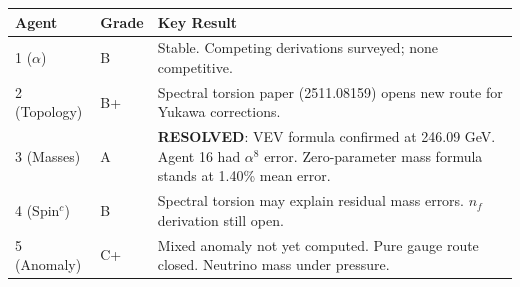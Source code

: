 \documentclass[11pt,a4paper]{article}
\newcommand{\RESOLVED}{\textcolor{dfdgreen}{\textbf{RESOLVED}}}
\begin{document}
\begin{center}
\begin{tabular}{llp{9cm}}
\toprule
\textbf{Agent} & \textbf{Grade} & \textbf{Key Result} \\
\midrule
1 ($\alpha$) & B & Stable. Competing derivations surveyed; none competitive. \\
2 (Topology) & B+ & Spectral torsion paper (2511.08159) opens new route for Yukawa corrections. \\
3 (Masses) & A & \RESOLVED: VEV formula confirmed at 246.09 GeV. Agent 16 had $\alpha^8$ error. Zero-parameter mass formula stands at 1.40\% mean error. \\
4 (Spin$^c$) & B & Spectral torsion may explain residual mass errors. $n_f$ derivation still open. \\
5 (Anomaly) & C+ & Mixed anomaly not yet computed. Pure gauge route closed. Neutrino mass under pressure. \\
\bottomrule
\end{tabular}
\end{center}
\end{document}
